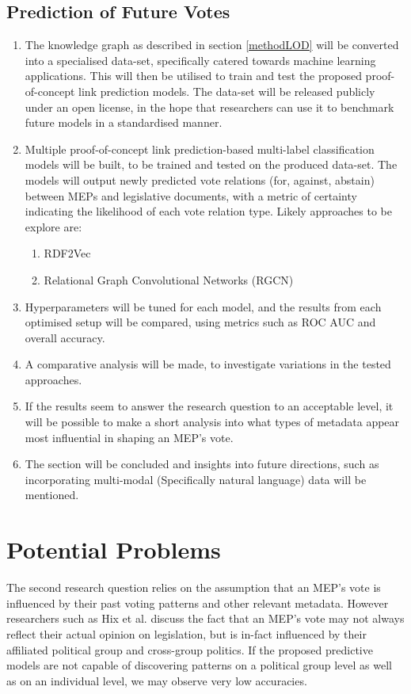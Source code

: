 \documentclass{article}
\begin{document}
\subsection{Prediction of Future Votes} \label{methodPrediction}
\begin{enumerate}
    \item The knowledge graph as described in section \ref{methodLOD} will be converted into a specialised data-set, specifically catered towards machine learning applications. This will then be utilised to train and test the proposed proof-of-concept link prediction models. The data-set will be released publicly under an open license, in the hope that researchers can use it to benchmark future models in a standardised manner.
    \item Multiple proof-of-concept link prediction-based multi-label classification models will be built, to be trained and tested on the produced data-set. The models will output newly predicted vote relations (for, against, abstain) between MEPs and legislative documents, with a metric of certainty indicating the likelihood of each vote relation type.
    \newline
    Likely approaches to be explore are:
    \begin{enumerate}
        \item RDF2Vec
        \item Relational Graph Convolutional Networks (RGCN)
    \end{enumerate}
    \item Hyperparameters will be tuned for each model, and the results from each optimised setup will be compared, using metrics such as ROC AUC and overall accuracy.
    \item A comparative analysis will be made, to investigate variations in the tested approaches.
    \item If the results seem to answer the research question to an acceptable level, it will be possible to make a short analysis into what types of metadata appear most influential in shaping an MEP's vote.
    \item The section will be concluded and insights into future directions, such as incorporating multi-modal (Specifically natural language) data will be mentioned.
\end{enumerate}

\section{Potential Problems}
The second research question relies on the assumption that an MEP's vote is influenced by their past voting patterns and other relevant metadata. However researchers such as Hix et al. \cite{Hix2009VotingPA} discuss the fact that an MEP's vote may not always reflect their actual opinion on legislation, but is in-fact influenced by their affiliated political group and cross-group politics. If the proposed predictive models are not capable of discovering patterns on a political group level as well as on an individual level, we may observe very low accuracies.
\end{document}
